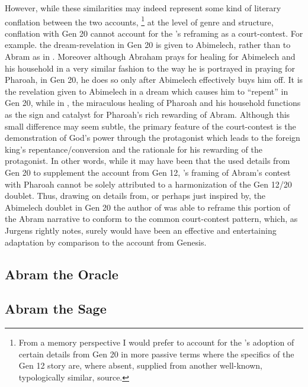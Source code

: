 However, while these similarities may indeed represent some kind of literary conflation between the two accounts,%
%
\footnote{From a memory perspective I would prefer to account for the \ga's adoption of certain details from Gen 20 in more passive terms where the specifics of the Gen 12 story are, where absent, supplied from another well-known, typologically similar, source.} 
%
at the level of genre and structure, conflation with Gen 20 cannot account for the \ga's reframing as a court-contest. For example. the dream-revelation in Gen 20 is given to Abimelech, rather than to Abram as in \ga. Moreover although Abraham prays for healing for Abimelech and his household in a very similar fashion to the way he is portrayed in \ga praying for Pharoah, in Gen 20, he does so only after Abimelech effectively buys him off. It is the revelation given to Abimelech in a dream which causes him to ``repent'' in Gen 20, while in \ga, the miraculous healing of Pharoah and his household functions as the sign and catalyst for Pharoah's rich rewarding of Abram. Although this small difference may seem subtle, the primary feature of the court-contest is the demonstration of God's power through the protagonist which leads to the foreign king's repentance/conversion and the rationale for his rewarding of the protagonist. In other words, while it may have been that the \ga used details from Gen 20 to supplement the account from Gen 12, \ga's framing of Abram's contest with Pharoah cannot be solely attributed to a harmonization of the Gen 12/20 doublet. Thus, drawing on details from, or perhaps just inspired by, the Abimelech doublet in Gen 20  the author of \ga was able to reframe this portion of the Abram narrative to conform to the common court-contest pattern, which, as Jurgens rightly notes, surely would have been an effective and entertaining adaptation by comparison to the account from Genesis.

\subsection{Abram the Oracle}




\subsection{Abram the Sage}
